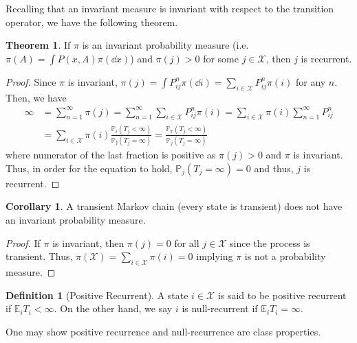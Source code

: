 \documentclass[]{article}
\theoremstyle{definition}
\newtheorem{theorem}{Theorem}
\newtheorem{corollary}{Corollary}[theorem]
\theoremstyle{definition}
\newtheorem{definition}{Definition}[section]
\begin{document}
Recalling that an invariant measure is invariant with respect to the transition operator, 
we have the following theorem.

\begin{theorem}
  If \(\pi\) is an invariant probability measure (i.e. \(\pi(A) = \int P(x, A) \pi(\dd x)\)) 
  and \(\pi(j) > 0\) for some \(j \in \mathcal{X}\), 
  then \(j\) is recurrent.
\end{theorem}
\begin{proof}
  Since \(\pi\) is invariant, \(\pi(j) = \int P^n_{ij} \pi(\dd i) = 
  \sum_{i \in \mathcal{X}} P^n_{ij}\pi(i)\) for any \(n\). Then, we have 
  \[\begin{split}
    \infty & = \sum_{n = 1}^\infty \pi(j) = \sum_{n = 1}^\infty \sum_{i \in \mathcal{X}} P^n_{ij}\pi(i) 
      = \sum_{i \in \mathcal{X}} \pi(i) \sum_{n = 1}^\infty P^n_{ij}\\
      & = \sum_{i \in \mathcal{X}} \pi(i) \frac{\mathbb{P}_i(T_j < \infty)}{\mathbb{P_j}(T_j = \infty)}
      = \frac{\mathbb{P}_{\pi}(T_j < \infty)}{\mathbb{P}_j(T_j = \infty)}
  \end{split}\]
  where numerator of the last fraction is positive as \(\pi(j) > 0\) and \(\pi\) 
  is invariant. Thus, in order for the equation to hold, \(\mathbb{P}_j(T_j = \infty) = 0\) 
  and thus, \(j\) is recurrent.
\end{proof}

\begin{corollary}
  A transient Markov chain (every state is transient) does not have an invariant probability 
  measure.
\end{corollary}
\begin{proof}
  If \(\pi\) is invariant, then \(\pi(j) = 0\) for all \(j \in \mathcal{X}\) since the process 
  is transient. Thus, \(\pi(\mathcal{X}) = \sum_{i \in \mathcal{X}} \pi(i) = 0\) implying \(\pi\) is 
  not a probability measure.
\end{proof}

\begin{definition}[Positive Recurrent]
  A state \(i \in \mathcal{X}\) is said to be positive recurrent if \(\mathbb{E}_i T_i < \infty\).
  On the other hand, we say \(i\) is null-recurrent if \(\mathbb{E}_i T_i = \infty\).

  One may show positive recurrence and null-recurrence are class properties.
\end{definition}
\end{document}

